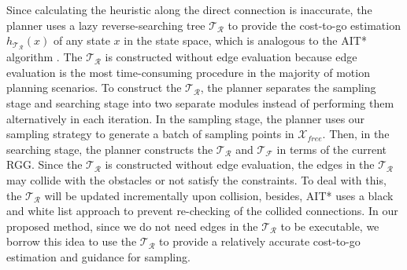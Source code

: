 Since calculating the heuristic along the direct connection is inaccurate, the planner uses a lazy reverse-searching tree $\mathcal{T}_{\mathcal{R}}$ to provide the cost-to-go estimation $h_{\mathcal{T}_{\mathcal{R}}}(x)$ of any state $x$ in the state space, which is analogous to the AIT* algorithm \cite{strub2020adaptively}.
The $\mathcal{T}_{\mathcal{R}}$ is constructed without edge evaluation because edge evaluation is the most time-consuming procedure in the majority of motion planning scenarios.
To construct the $\mathcal{T}_{\mathcal{R}}$, the planner separates the sampling stage and searching stage into two separate modules instead of performing them alternatively in each iteration.
In the sampling stage, the planner uses our sampling strategy to generate a batch of sampling points in $\mathcal{X}_{free}$. 
Then, in the searching stage, the planner constructs the $\mathcal{T}_{\mathcal{R}}$ and $\mathcal{T}_{\mathcal{F}}$ in terms of the current RGG.
Since the $\mathcal{T}_{\mathcal{R}}$ is constructed without edge evaluation, the edges in the $\mathcal{T}_{\mathcal{R}}$ may collide with the obstacles or not satisfy the constraints.
To deal with this, the $\mathcal{T}_{\mathcal{R}}$ will be updated incrementally upon collision, besides, AIT* uses a black and white list approach to prevent re-checking of the collided connections.
In our proposed method, since we do not need edges in the $\mathcal{T}_{\mathcal{R}}$ to be executable, we borrow this idea to use the $\mathcal{T}_{\mathcal{R}}$ to provide a relatively accurate cost-to-go estimation and guidance for sampling.

